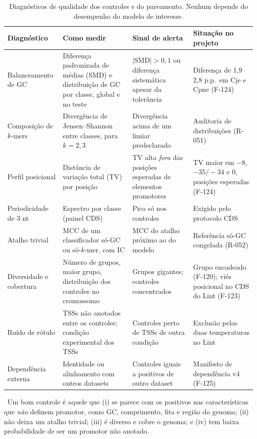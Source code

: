 \documentclass[11pt,a4paper]{article}
\newcommand{\etiqueta}[2]{\tcbox[on line, colback=#1!10, colframe=#1!75!black,
  boxrule=0.4pt, arc=1.2pt, left=1.5pt, right=1.5pt, top=0pt, bottom=0pt,
  fontupper=\sffamily\scriptsize\bfseries]{#2}}
\newcommand{\proj}{\etiqueta{oiGreen}{Projeto}}
\newcommand{\rec}{\etiqueta{oiVerm}{Recomendação}}
\begin{document}
\begin{table}[htbp]
\centering\small
\caption{Diagnósticos de qualidade dos controles e do pareamento. Nenhum depende do desempenho do modelo de interesse.}
\label{tab:diagnosticos}
\begin{tabularx}{\linewidth}{L{2.7cm}YL{3.4cm}L{3.0cm}}
\toprule
Diagnóstico & Como medir & Sinal de alerta \rec & Situação no projeto \proj \\
\midrule
Balanceamento de GC & Diferença padronizada de médias (SMD) e distribuição de GC por classe, global e no teste & $|\text{SMD}|>0{,}1$ ou diferença sistemática apesar da tolerância & Diferença de 1,9--2,8 p.p.\ em Cje e Cpne (F-124) \\
Composição de $k$-mers & Divergência de Jensen--Shannon entre classes, para $k=2,3$ & Divergência acima de um limiar predeclarado & Auditoria de distribuições (R-051) \\
Perfil posicional & Distância de variação total (TV) por posição & TV alta \emph{fora} das posições esperadas de elementos promotores & TV maior em $-8$, $-35/-34$ e 0, posições esperadas (F-124) \\
Periodicidade de 3 nt & Espectro por classe (painel CDS) & Pico só nos controles & Exigido pelo protocolo CDS \\
Atalho trivial & MCC de um classificador só-GC ou só-$k$-mer, com IC & MCC do atalho próximo ao do modelo & Referência só-GC congelada (R-052) \\
Diversidade e cobertura & Número de grupos, maior grupo, distribuição dos controles no cromossomo & Grupos gigantes; controles concentrados & Grupo encadeado (F-120); viés posicional no CDS do Lint (F-123) \\
Ruído de rótulo & TSSs não anotados entre os controles; condição experimental dos TSSs & Controles perto de TSSs de outra condição & Exclusão pelas duas temperaturas no Lint \\
Dependência externa & Identidade ou alinhamento com outros datasets & Controles iguais a positivos de outro dataset & Manifesto de dependência v4 (F-125) \\
\bottomrule
\end{tabularx}
\end{table}

\rec\ Um bom controle é aquele que (i) se parece com os positivos nas características que \emph{não} definem promotor, como GC, comprimento, fita e região do genoma; (ii) não deixa um atalho trivial; (iii) é diverso e cobre o genoma; e (iv) tem baixa probabilidade de ser um promotor não anotado.
\end{document}

